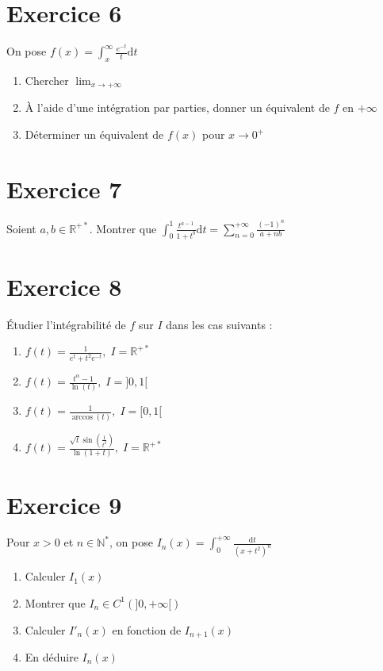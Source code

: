 \documentclass[11pt]{article}
\begin{document}
\section*{Exercice 6}

On pose $f(x)=\int_x^\infty \frac{e^{-t}}{t}\mathrm{d}t$

\begin{enumerate}
\item Chercher $\lim_{x\to {+\infty}}$
\item À l'aide d'une intégration par parties, donner un équivalent de $f$ en $+\infty$
\item Déterminer un équivalent de $f(x)$ pour $x\to 0^{+}$
\end{enumerate}

\section*{Exercice 7}

Soient $a,b \in \mathbb{R^{+*}}$. Montrer que $\int_0^1 \frac{t^{a-1}}{1+t^b}\mathrm{d}t = \sum_{n=0}^{+\infty} \frac{(-1)^n}{a+nb}$

\section*{Exercice 8}

Étudier l'intégrabilité de $f$ sur $I$ dans les cas suivants :

\begin{enumerate}
\item $ f(t) =\frac{1}{e^t +t^2e^{-t}}, \;I=\mathbb{R^{+*}}$
\item $ f(t)=\frac{t^\alpha -1}{\ln(t)},\; I=]0,1[$
\item $ f(t)=\frac{1}{\arccos(t)},\; I=[0,1[$
\item $ f(t)=\frac{\sqrt{t}\sin(\frac{1}{t^2})}{\ln(1+t)},\; I=\mathbb{R^{+*}}$
\end{enumerate}

\section*{Exercice 9}

Pour $x>0$ et $n\in\mathbb{N^*}$, on pose $I_n(x)=\displaystyle\int_0^{+\infty} \frac{\mathrm{d}t}{(x+t^2)^n}$

\begin{enumerate}
\item Calculer $I_1(x)$
\item Montrer que $I_n\in C^1(]0,+\infty[)$
\item Calculer $I'_n (x)$ en fonction de $I_{n+1}(x)$
\item En déduire $I_n(x)$
\end{enumerate}
\end{document}
